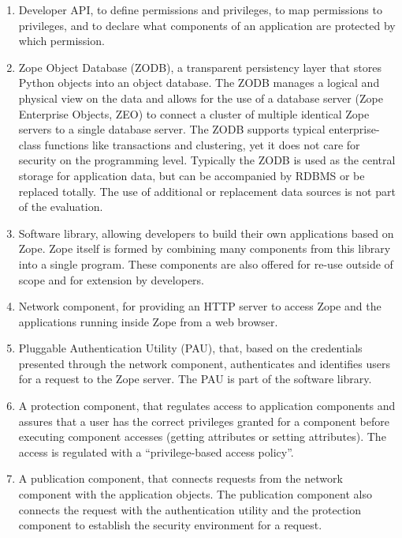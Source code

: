 \documentclass[12pt,english]{scrbook}
\begin{document}
\begin{enumerate}

\item Developer API, to define permissions and privileges, to map permissions
to privileges, and to declare what components of an application are protected
by which permission. 

\item Zope Object Database (ZODB), a transparent persistency layer that stores
Python objects into an object database. The ZODB manages a logical and physical
view on the data and allows for the use of a database server (Zope Enterprise
Objects, ZEO) to connect a cluster of multiple identical Zope servers to a
single database server. The ZODB supports typical enterprise-class functions
like transactions and clustering, yet it does not care for security on
the programming level. Typically the ZODB is used as the central storage for
application data, but can be accompanied by RDBMS or be replaced totally. The
use of additional or replacement data sources is not part of the evaluation.


\item Software library, allowing developers to build their own applications
based on Zope. Zope itself is formed by combining many components from this
library into a single program.  These components are also offered for re-use
outside of scope and for extension by developers.

\item Network component, for providing an HTTP server to access Zope and the
applications running inside Zope from a web browser.

\item Pluggable Authentication Utility (PAU), that, based on the credentials
presented through the network component, authenticates and identifies users for
a request to the Zope server. The PAU is part of the software library.

\item A protection component, that regulates access to application components
and assures that a user has the correct privileges granted for a component
before executing component accesses (getting attributes or setting attributes).
The access is regulated with a ``privilege-based access policy''.

\item A publication component, that connects requests from the network
component with the application objects. The publication component also connects
the request with the authentication utility and the protection component to
establish the security environment for a request.

\end{enumerate}
\end{document}
